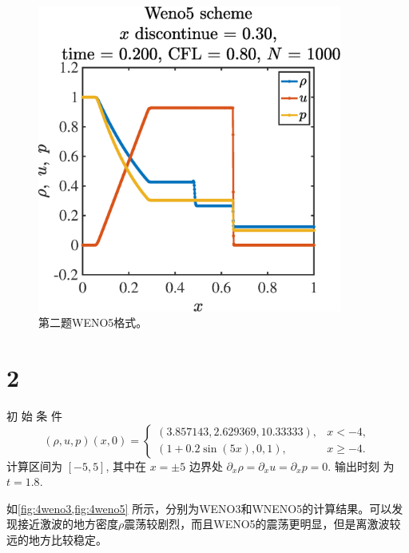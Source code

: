 \documentclass[12pt]{article}
\begin{document}
\begin{figure}[htp]
	\centering
	\includegraphics[width=10cm]{2weno5.eps}
	\caption{第二题WENO5格式。}
	\label{fig:2weno5}
\end{figure}




\section{2}

初 始 条 件
\begin{equation}
	(\rho, u, p)(x, 0)=\left\{\begin{array}{ll}
		(3.857143,2.629369,10.33333), & x<-4,     \\
		(1+0.2 \sin (5 x), 0,1),      & x \geq-4.
	\end{array}\right.
\end{equation}
计算区间为 $[-5,5]$, 其中在 $x=\pm 5$ 边界处 $\partial_{x} \rho=\partial_{x} u=\partial_{x} p=0 .$ 输出时刻 为 $t=1.8$.

如\cref{fig:4weno3,fig:4weno5} 所示，分别为WENO3和WNENO5的计算结果。可以发现接近激波的地方密度$\rho$震荡较剧烈，而且WENO5的震荡更明显，但是离激波较远的地方比较稳定。
\end{document}
